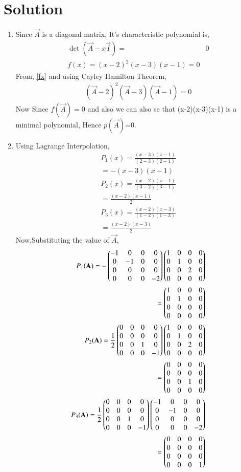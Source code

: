 \documentclass[journal,12pt,twocolumn]{IEEEtran}
\begin{document}
\section{\textbf{Solution}}
\begin{enumerate}
\item{
Since $\vec{A}$ is a diagonal matrix, It's characteristic polynomial is,
\begin{align}
\det{(\vec{A} - x \vec{I})} =&0\\
f(x)=(x-2)^2(x-3)(x-1)=0\label{fx}
\end{align}
From, \eqref{fx} and using Cayley Hamilton Theorem,
\begin{align}
(\vec{A}-2)^2(\vec{A}-3)(\vec{A}-1)=0
\end{align}
Now Since $f(\vec{A})=0$ and also we can also se that (x-2)(x-3)(x-1) is a minimal polynomial, Hence $p(\vec{A})$=0.}
\item{Using Lagrange Interpolation,
\begin{align}
P_1(x)=\frac{(x-3)(x-1)}{(2-3)(2-1)}\\
=-(x-3)(x-1)\\
P_2(x)=\frac{(x-2)(x-1)}{(3-2)(3-1)}\\
=\frac{(x-2)(x-1)}{2}\\
P_3(x)=\frac{(x-2)(x-3)}{(1-2)(1-3)}\\
=\frac{(x-2)(x-3)}{2}
\end{align}
Now,Substituting the value of $\vec{A}$,
\begin{align}
P_1(\mathbf{A})=-\begin{pmatrix}-1&0&0&0\\0&-1&0&0\\0&0&0&0\\0&0&0&-2\end{pmatrix}\begin{pmatrix}1&0&0&0\\0&1&0&0\\0&0&2&0\\0&0&0&0\end{pmatrix}\\=\begin{pmatrix}1&0&0&0\\0&1&0&0\\0&0&0&0\\0&0&0&0\end{pmatrix}\\
P_2(\mathbf{A})=\frac{1}{2}\begin{pmatrix}0&0&0&0\\0&0&0&0\\0&0&1&0\\0&0&0&-1\end{pmatrix}\begin{pmatrix}1&0&0&0\\0&1&0&0\\0&0&2&0\\0&0&0&0\end{pmatrix}\\=\begin{pmatrix}0&0&0&0\\0&0&0&0\\0&0&1&0\\0&0&0&0\end{pmatrix}\\
P_3(\mathbf{A})=\frac{1}{2}\begin{pmatrix}0&0&0&0\\0&0&0&0\\0&0&1&0\\0&0&0&-1\end{pmatrix}\begin{pmatrix}-1&0&0&0\\0&-1&0&0\\0&0&0&0\\0&0&0&-2\end{pmatrix}\\=\begin{pmatrix}0&0&0&0\\0&0&0&0\\0&0&0&0\\0&0&0&1\end{pmatrix}
\end{align}}
\end{enumerate}
\end{document}
